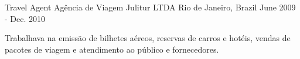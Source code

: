 \begin{cventries}
\cventry
{Travel Agent} %
{Agência de Viagem Julitur LTDA} %
{Rio de Janeiro, Brazil} %
{June 2009 - Dec. 2010} %
{ %
\begin{cvitems}
\item {Trabalhava na emissão de bilhetes aéreos, reservas de carros e hotéis, vendas de pacotes de viagem e
atendimento ao público e fornecedores.}
\end{cvitems}
}


\end{cventries}